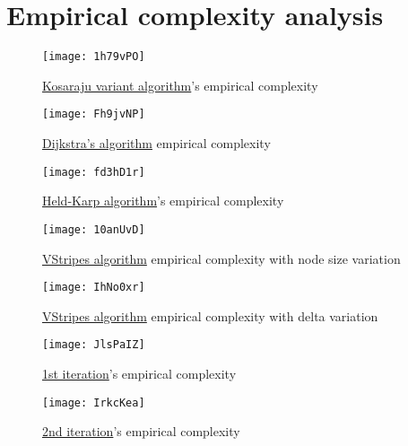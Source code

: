 \chapter{Empirical complexity analysis} \label{empirical}

\begin{figure}[H]
    \centering
    \texttt{[image: 1h79vPO]}
    \caption{\hyperref[algorithm-scc-kosaraju-v]{Kosaraju variant algorithm}'s empirical complexity}
\end{figure}

\begin{figure}[H]
    \centering
    \texttt{[image: Fh9jvNP]}
    \caption{\hyperref[algorithm-shortestpath-dijkstra]{Dijkstra's algorithm} empirical complexity}
\end{figure}

\begin{figure}[H]
    \centering
    \texttt{[image: fd3hD1r]}
    \caption{\hyperref[algorithm-tsp-heldkarp]{Held-Karp algorithm}'s empirical complexity}
\end{figure}

\begin{figure}[H]
    \centering
    \texttt{[image: 10anUvD]}
    \caption{\hyperref[algorithm-vstripes]{VStripes algorithm} empirical complexity with node size variation}
\end{figure}

\begin{figure}[H]
    \centering
    \texttt{[image: IhNo0xr]}
    \caption{\hyperref[algorithm-vstripes]{VStripes algorithm} empirical complexity with delta variation}
\end{figure}

\begin{figure}[H]
    \centering
    \texttt{[image: JlsPaIZ]}
    \caption{\hyperref[iterations]{1st iteration}'s empirical complexity}
\end{figure}

\begin{figure}[H]
    \centering
    \texttt{[image: IrkcKea]}
    \caption{\hyperref[iterations]{2nd iteration}'s empirical complexity}
\end{figure}

